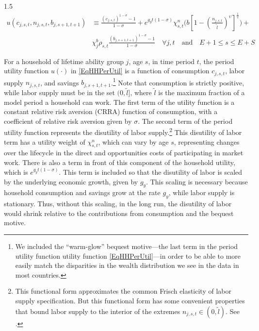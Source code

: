 \documentclass[letterpaper,12pt]{article}
\theoremstyle{definition}
\begin{document}
\begin{spacing}{1.5}
    \begin{equation}\label{EqHHPerUtil}
      \begin{split}
        u(c_{j,s,t},n_{j,s,t},b_{j,s+1,t+1}) &\equiv \frac{(c_{j,s,t})^{1-\sigma} - 1}{1-\sigma} + e^{g_y t(1-\sigma)}\chi^n_{s,t}\biggl(b\left[1 - \left(\frac{n_{j,s,t}}{\tilde{l}}\right)^\upsilon\right]^{\frac{1}{\upsilon}}\biggr) + \\
        &\chi^b_j \rho_{s,t} \frac{(b_{j,s+1,t+1})^{1-\sigma} - 1}{1-\sigma} \quad\forall j,t \quad\text{and}\quad E+1 \leq s \leq E+S
      \end{split}
    \end{equation}

    For a household of lifetime ability group $j$, age $s$, in time period $t$, the period utility function $u(\cdot)$ in \eqref{EqHHPerUtil} is a function of consumption $c_{j,s,t}$, labor supply $n_{j,s,t}$, and savings $b_{j,s+1,t+1}$.\footnote{We included the ``warm-glow'' bequest motive---the last term in the period utility function utility function \eqref{EqHHPerUtil}---in order to be able to more easily match the disparities in the wealth distribution we see in the data in most countries.} Note that consumption is strictly positive, while labor supply must be in the set $(0, \tilde{l}]$, where $\tilde{l}$ is the maximum fraction of a model period a household can work. The first term of the utility function is a constant relative risk aversion (CRRA) function of consumption, with a coefficient of relative risk aversion given by $\sigma$. The second term of the period utility function represents the disutility of labor supply.\footnote{This functional form approximates the common Frisch elasticity of labor supply specification. But this functional form has some convenient properties that bound labor supply to the interior of the extremes $n_{j,s,t}\in(0,\tilde{l})$. See \citet{EvansPhillips:2017}.} This disutility of labor term has a utility weight of $\chi^n_{s,t}$, which can vary by age $s$, representing changes over the lifecycle in the direct and opportunities costs of participating in market work. There is also a term in front of this component of the household utility, which is $e^{g_yt(1-\sigma)}$. This term is included so that the disutility of labor is scaled by the underlying economic growth, given by $g_y$. This scaling is necessary because household consumption and savings grow at the rate $g_y$, while labor supply is stationary. Thus, without this scaling, in the long run, the disutility of labor would shrink relative to the contributions from consumption and the bequest motive.


\end{spacing}
\end{document}
